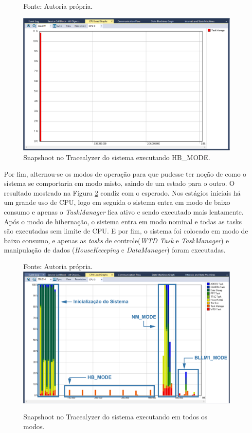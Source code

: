\begin{figure}[h]
\footnotesize{	
	\centering
			\centering
	\footnotesize{Fonte: Autoria própria.}
	
	\includegraphics[keepaspectratio=true,scale=0.41]{figuras/trace_snapshoot_4.PNG}
	\caption{Snapshoot no Tracealyzer do sistema executando HB\_MODE.}
	\label{trace_snapshoot_4}
}
\end{figure}
\FloatBarrier

\newpage
Por fim, alternou-se os modos de operação para que pudesse ter noção de como o sistema se comportaria em modo misto, saindo de um estado para o outro. O resultado mostrado na Figura \ref{trace_snapshoot_8} condiz com o esperado. Nos estágios iniciais há um grande uso de CPU, logo em seguida o sistema entra em modo de baixo consumo e apenas o \textit{TaskManager} fica ativo e sendo executado mais lentamente. Após o modo de hibernação, o sistema entra em modo nominal e todas as tasks são executadas sem limite de CPU. E por fim, o sistema foi colocado em modo de baixo consumo, e apenas as \textit{tasks} de controle(\textit{WTD Task} e \textit{TaskManager}) e manipulação de dados (\textit{HouseKeeeping} e \textit{DataManager}) foram executadas.

\begin{figure}[h]
\footnotesize{	
	\centering
			\centering
	\footnotesize{Fonte: Autoria própria.}
	\includegraphics[keepaspectratio=true,scale=0.51]{figuras/trace_snapshoot_8.PNG}
	\caption{Snapshoot no Tracealyzer do sistema executando em todos os modos.}
	\label{trace_snapshoot_8}
}
\end{figure}
\FloatBarrier

